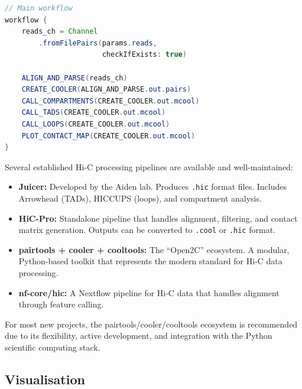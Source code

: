 \begin{lstlisting}[language=Java, caption={Nextflow DSL2 workflow for Hi-C analysis.}, label={lst:3dgenome:nextflow}]
// Main workflow
workflow {
    reads_ch = Channel
        .fromFilePairs(params.reads,
                       checkIfExists: true)

    ALIGN_AND_PARSE(reads_ch)
    CREATE_COOLER(ALIGN_AND_PARSE.out.pairs)
    CALL_COMPARTMENTS(CREATE_COOLER.out.mcool)
    CALL_TADS(CREATE_COOLER.out.mcool)
    CALL_LOOPS(CREATE_COOLER.out.mcool)
    PLOT_CONTACT_MAP(CREATE_COOLER.out.mcool)
}
\end{lstlisting}

\begin{tipbox}
Several established Hi-C processing pipelines are available and well-maintained:
\begin{itemize}[itemsep=1pt]
  \item \textbf{Juicer:} Developed by the Aiden lab. Produces \texttt{.hic} format files. Includes Arrowhead (TADs), HICCUPS (loops), and compartment analysis.
  \item \textbf{HiC-Pro:} Standalone pipeline that handles alignment, filtering, and contact matrix generation. Outputs can be converted to \texttt{.cool} or \texttt{.hic} format.
  \item \textbf{pairtools + cooler + cooltools:} The ``Open2C'' ecosystem. A modular, Python-based toolkit that represents the modern standard for Hi-C data processing.
  \item \textbf{nf-core/hic:} A Nextflow pipeline for Hi-C data that handles alignment through feature calling.
\end{itemize}
For most new projects, the pairtools/cooler/cooltools ecosystem is recommended due to its flexibility, active development, and integration with the Python scientific computing stack.
\end{tipbox}

\subsection{Visualisation}
\label{subsec:3dgenome:visualisation}

